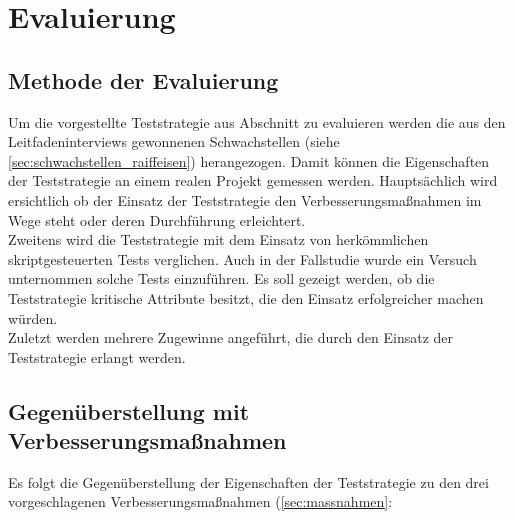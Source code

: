 \chapter{Evaluierung}
\label{sec:mbt_bdt}
\section{Methode der Evaluierung}
Um die vorgestellte Teststrategie aus Abschnitt \label{sec:mbt_bdt_concept} zu evaluieren werden die aus den Leitfadeninterviews gewonnenen Schwachstellen (siehe \ref{sec:schwachstellen_raiffeisen}) herangezogen. Damit können die Eigenschaften der Teststrategie an einem realen Projekt gemessen werden. Hauptsächlich wird ersichtlich ob der Einsatz der Teststrategie den Verbesserungsmaßnahmen im Wege steht oder deren Durchführung erleichtert.\\
Zweitens wird die Teststrategie mit dem Einsatz von herkömmlichen skriptgesteuerten Tests verglichen. Auch in der Fallstudie wurde ein Versuch unternommen solche Tests einzuführen. Es soll gezeigt werden, ob die Teststrategie kritische Attribute besitzt, die den Einsatz erfolgreicher machen würden.\\
Zuletzt werden mehrere Zugewinne angeführt, die durch den Einsatz der Teststrategie erlangt werden.

\section{Gegenüberstellung mit Verbesserungsmaßnahmen}
Es folgt die Gegenüberstellung der Eigenschaften der Teststrategie zu den drei vorgeschlagenen Verbesserungsmaßnahmen (\ref{sec:massnahmen}:

